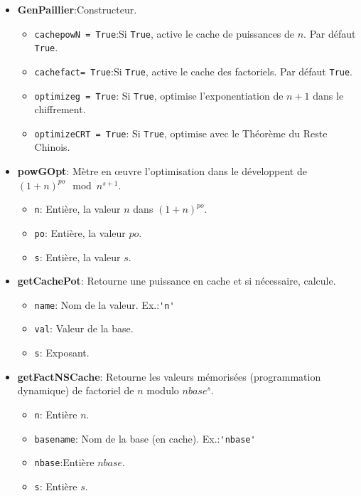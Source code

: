 	\begin{itemize} \renewcommand{\labelitemi}{} \renewcommand{\labelitemii}{$~~argument$}

		\item \textbf{GenPaillier}:Constructeur.
			\begin{itemize}
				\item \verb!cachepowN = True!:Si \verb!True!, active 
				le cache de puissances de $n$. Par défaut \verb!True!.
				\item \verb!cachefact= True!:Si \verb!True!, active 
				le cache des factoriels. Par défaut \verb!True!.
				\item \verb!optimizeg = True!: Si \verb!True!, optimise  
				l'exponentiation de $n+1$ dans le chiffrement.
				\item \verb!optimizeCRT = True!: Si \verb!True!, optimise  
				avec le Théo\-rè\-me du Reste Chinois.
			\end{itemize}
		\item \textbf{powGOpt}: Mètre en œuvre l'optimisation dans le développent de $(1+n)^{po} \mod{n^{s+1}}$.
			\begin{itemize}
				\item \verb!n!: Entière, la valeur $n$ dans $(1+n)^{po}$.
				\item \verb!po!: Entière, la valeur $po$.
				\item \verb!s!: Entière, la valeur $s$.
			\end{itemize}
		\item \textbf{getCachePot}: Retourne une puissance en cache et si nécessaire, calcule.
			\begin{itemize}
				\item \verb!name!: Nom de la valeur. Ex.:\verb!'n'! 
				\item \verb!val!: Valeur de la base.
				\item \verb!s!: Exposant.
			\end{itemize}
		\item \textbf{getFactNSCache}: Retourne les valeurs mémorisées (programmation dynamique) de factoriel de $n$ modulo $nbase^s$.
			\begin{itemize}
				\item \verb!n!: Entière $n$.
				\item \verb!basename!: Nom de la base (en cache). Ex.:\verb!'nbase'! 
				\item \verb!nbase!:Entière $nbase$.
				\item \verb!s!: Entière $s$.
			\end{itemize}

\end{itemize}
